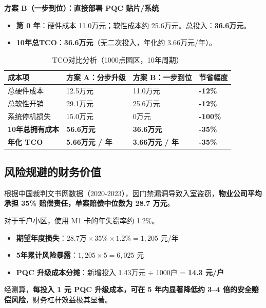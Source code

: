 \vspace{0.5em}
\noindent\textbf{方案 B（一步到位）：直接部署 PQC 贴片/系统}
\begin{itemize}
	\item \textbf{第 0 年}：硬件成本 11.0万元；软性成本约 25.6万元。总投入：\textbf{36.6万元}。
	\item \textbf{10年总TCO}：\textbf{36.6万元}（无二次投入，年化约 3.66万元/年）。
\end{itemize}

\begin{table}[H]
	\centering
	\caption{TCO对比分析（1000点园区，10年周期）}
	\label{tab:tco_analysis}
	\renewcommand{\arraystretch}{1.4}
	\begin{tabular}{p{3.5cm}p{4cm}p{4cm}p{2.5cm}}
		\toprule
		\textbf{成本项} & \textbf{方案 A：分步升级} & \textbf{方案 B：一步到位} & \textbf{节省幅度} \\
		\midrule
		总硬件成本 & 12.5万元 & 11.0万元 & \textbf{-12\%} \\
		总软性开销 & 29.1万元 & 25.6万元 & \textbf{-12\%} \\
		系统停机损失 & 15.0万元 & 0万元 & \textbf{-100\%} \\
		\textbf{10年总拥有成本} & \textbf{56.6万元} & \textbf{36.6万元} & \textbf{-35\%} \\
		\textbf{年化 TCO} & \textbf{5.66万元 / 年} & \textbf{3.66万元 / 年} & \textbf{-35\%} \\
		\bottomrule
	\end{tabular}
\end{table}

\subsection{风险规避的财务价值}

根据中国裁判文书网数据（2020-2023），因门禁漏洞导致入室盗窃，\textbf{物业公司平均承担 35\% 赔偿责任，单案赔偿中位数为 28.7 万元}。

对于千户小区，使用 M1 卡的年失窃率约 1.2\%。
\begin{itemize}
	\item \textbf{期望年度损失}：$28.7万 \times 35\% \times 1.2\% = 1,205$ 元/年
	\item \textbf{5年累计风险暴露}：$1,205 \times 5 = 6,025$ 元
	\item \textbf{PQC 升级成本分摊}：新增投入 1.43万元 $\div$ 1000户 = \textbf{14.3 元/户}
\end{itemize}
经测算，\textbf{每投入 1 元 PQC 升级成本，可在 5 年内显著降低约 3–4 倍的安全赔偿风险}，财务杠杆效益极其显著。

